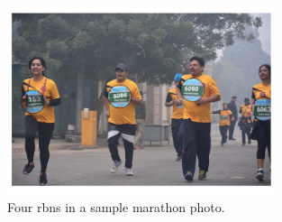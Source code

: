 \newpage
\begin{figure}[h!]
  \centering
  \includegraphics[width=0.7\textwidth]{images/introduction/rbn}
  \caption[Sample racing bib numbers]{Four \glspl{rbn} in a sample marathon photo.}
  \label{fig:sample_rbns}
\end{figure}
\vspace{\fill}

